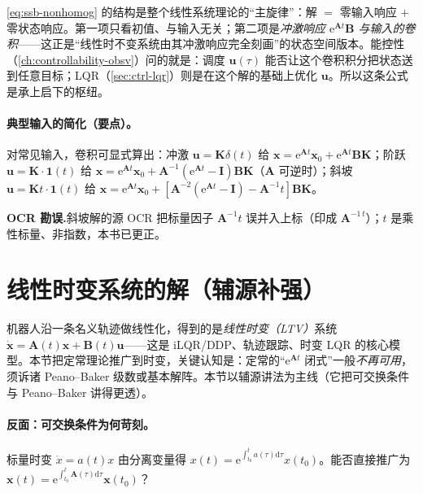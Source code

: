 \begin{insight}
\cref{eq:ssb-nonhomog} 的结构是整个线性系统理论的“主旋律”：解 $=$ 零输入响应 $+$ 零状态响应。第一项只看初值、与输入无关；第二项是\emph{冲激响应 $\mathrm{e}^{\mathbf{A}t}\mathbf{B}$ 与输入的卷积}——这正是“线性时不变系统由其冲激响应完全刻画”的状态空间版本。能控性（\cref{ch:controllability-obsv}）问的就是：调度 $\mathbf{u}(\tau)$ 能否让这个卷积积分把状态送到任意目标；LQR（\cref{sec:ctrl-lqr}）则是在这个解的基础上优化 $\mathbf{u}$。所以这条公式是承上启下的枢纽。
\end{insight}

\paragraph{典型输入的简化（要点）。}
对常见输入，卷积可显式算出\cite{liubao2006modern}：冲激 $\mathbf{u}=\mathbf{K}\delta(t)$ 给 $\mathbf{x}=\mathrm{e}^{\mathbf{A}t}\mathbf{x}_0+\mathrm{e}^{\mathbf{A}t}\mathbf{B}\mathbf{K}$；阶跃 $\mathbf{u}=\mathbf{K}\cdot\mathbf{1}(t)$ 给 $\mathbf{x}=\mathrm{e}^{\mathbf{A}t}\mathbf{x}_0+\mathbf{A}^{-1}(\mathrm{e}^{\mathbf{A}t}-\mathbf{I})\mathbf{B}\mathbf{K}$（$\mathbf{A}$ 可逆时）；斜坡 $\mathbf{u}=\mathbf{K}t\cdot\mathbf{1}(t)$ 给 $\mathbf{x}=\mathrm{e}^{\mathbf{A}t}\mathbf{x}_0+[\mathbf{A}^{-2}(\mathrm{e}^{\mathbf{A}t}-\mathbf{I})-\mathbf{A}^{-1}t]\mathbf{B}\mathbf{K}$。
\begin{note}\textbf{OCR 勘误.}\;斜坡解的源 OCR 把标量因子 $\mathbf{A}^{-1}t$ 误并入上标（印成 $\mathbf{A}^{-1\,t}$）；$t$ 是乘性标量、非指数，本书已更正\cite{liubao2006modern}。\end{note}

\section{线性时变系统的解（辅源补强）}
\label{sec:ssb-ltv}

机器人沿一条名义轨迹做线性化，得到的是\emph{线性时变（LTV）}系统 $\dot{\mathbf{x}}=\mathbf{A}(t)\mathbf{x}+\mathbf{B}(t)\mathbf{u}$——这是 iLQR/DDP、轨迹跟踪、时变 LQR 的核心模型。本节把定常理论推广到时变，关键认知是：定常的“$\mathrm{e}^{\mathbf{A}t}$ 闭式”一般\emph{不再可用}，须诉诸 Peano--Baker 级数或基本解阵。本节以辅源\cite{zhang2017modern}讲法为主线（它把可交换条件与 Peano--Baker 讲得更透）。

\paragraph{反面：可交换条件为何苛刻。}
标量时变 $\dot x=a(t)x$ 由分离变量得 $x(t)=\mathrm{e}^{\int_{t_0}^t a(\tau)\mathrm{d}\tau}x(t_0)$。能否直接推广为 $\mathbf{x}(t)=\mathrm{e}^{\int_{t_0}^t\mathbf{A}(\tau)\mathrm{d}\tau}\mathbf{x}(t_0)$？


